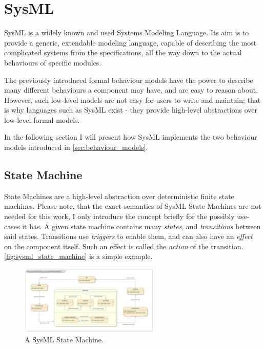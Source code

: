 \section{SysML}\label{sec:sysml}

SysML is a widely known and used Systems Modeling Language. Its aim is to provide a generic, extendable modeling language, capable of describing the most complicated systems from the specifications, all the way down to the actual behaviours of specific modules.

The previously introduced formal behaviour models have the power to describe many different behaviours a component may have, and are easy to reason about. However, such low-level models are not easy for users to write and maintain; that is why languages such as SysML exist - they provide high-level abstractions over low-level formal models.

In the following section I will present how SysML implements the two behaviour models introduced in \autoref{sec:behaviour_models}.

\subsection{State Machine}

State Machines are a high-level abstraction over deterministic finite state machines. Please note, that the exact semantics of SysML State Machines are not needed for this work, I only introduce the concept briefly for the possibly use-cases it has. A given state machine contains many \emph{states}, and \emph{transitions} between said states. Transitions use \emph{triggers} to enable them, and can also have an \emph{effect} on the component itself. Such an effect is called the \emph{action} of the transition. \autoref{fig:sysml_state_machine} is a simple example.

\begin{figure}[!ht]
	\centering
	\includegraphics[width=67mm, keepaspectratio]{figures/sysml_state_machine.png}\hspace{1cm}
	\caption{A SysML State Machine.}
	\label{fig:sysml_state_machine}
\end{figure}

